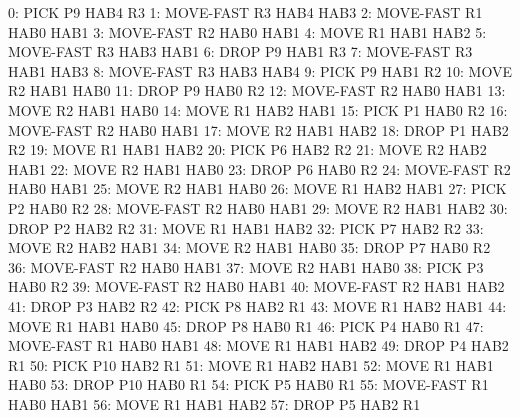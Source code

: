 \documentclass[	DIV=calc,%
							paper=a4,%
							fontsize=11pt]{scrartcl}	 					%
\begin{document}
\begin{bashcode}
        0: PICK P9 HAB4 R3
        1: MOVE-FAST R3 HAB4 HAB3
        2: MOVE-FAST R1 HAB0 HAB1
        3: MOVE-FAST R2 HAB0 HAB1
        4: MOVE R1 HAB1 HAB2
        5: MOVE-FAST R3 HAB3 HAB1
        6: DROP P9 HAB1 R3
        7: MOVE-FAST R3 HAB1 HAB3
        8: MOVE-FAST R3 HAB3 HAB4
        9: PICK P9 HAB1 R2
       10: MOVE R2 HAB1 HAB0
       11: DROP P9 HAB0 R2
       12: MOVE-FAST R2 HAB0 HAB1
       13: MOVE R2 HAB1 HAB0
       14: MOVE R1 HAB2 HAB1
       15: PICK P1 HAB0 R2
       16: MOVE-FAST R2 HAB0 HAB1
       17: MOVE R2 HAB1 HAB2
       18: DROP P1 HAB2 R2
       19: MOVE R1 HAB1 HAB2
       20: PICK P6 HAB2 R2
       21: MOVE R2 HAB2 HAB1
       22: MOVE R2 HAB1 HAB0
       23: DROP P6 HAB0 R2
       24: MOVE-FAST R2 HAB0 HAB1
       25: MOVE R2 HAB1 HAB0
       26: MOVE R1 HAB2 HAB1
       27: PICK P2 HAB0 R2
       28: MOVE-FAST R2 HAB0 HAB1
       29: MOVE R2 HAB1 HAB2
       30: DROP P2 HAB2 R2
       31: MOVE R1 HAB1 HAB2
       32: PICK P7 HAB2 R2
       33: MOVE R2 HAB2 HAB1
       34: MOVE R2 HAB1 HAB0
       35: DROP P7 HAB0 R2
       36: MOVE-FAST R2 HAB0 HAB1
       37: MOVE R2 HAB1 HAB0
       38: PICK P3 HAB0 R2
       39: MOVE-FAST R2 HAB0 HAB1
       40: MOVE-FAST R2 HAB1 HAB2
       41: DROP P3 HAB2 R2
       42: PICK P8 HAB2 R1
       43: MOVE R1 HAB2 HAB1
       44: MOVE R1 HAB1 HAB0
       45: DROP P8 HAB0 R1
       46: PICK P4 HAB0 R1
       47: MOVE-FAST R1 HAB0 HAB1
       48: MOVE R1 HAB1 HAB2
       49: DROP P4 HAB2 R1
       50: PICK P10 HAB2 R1
       51: MOVE R1 HAB2 HAB1
       52: MOVE R1 HAB1 HAB0
       53: DROP P10 HAB0 R1
       54: PICK P5 HAB0 R1
       55: MOVE-FAST R1 HAB0 HAB1
       56: MOVE R1 HAB1 HAB2
       57: DROP P5 HAB2 R1
\end{bashcode}
\end{document}
